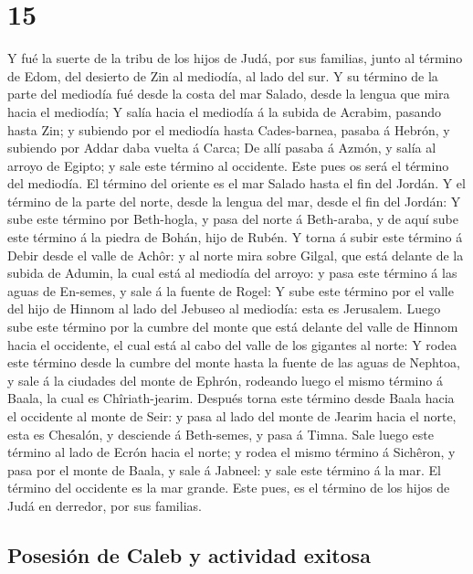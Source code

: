\hypertarget{section-14}{%
\section{15}\label{section-14}}

 Y fué la suerte de la tribu de los hijos de Judá, por sus
familias, junto al término de Edom, del desierto de Zin al mediodía, al
lado del sur.  Y su término de la parte del mediodía fué
desde la costa del mar Salado, desde la lengua que mira hacia el
mediodía;  Y salía hacia el mediodía á la subida de Acrabim,
pasando hasta Zin; y subiendo por el mediodía hasta Cades-barnea, pasaba
á Hebrón, y subiendo por Addar daba vuelta á Carca;  De allí
pasaba á Azmón, y salía al arroyo de Egipto; y sale este término al
occidente. Este pues os será el término del mediodía.  El
término del oriente es el mar Salado hasta el fin del Jordán. Y el
término de la parte del norte, desde la lengua del mar, desde el fin del
Jordán:  Y sube este término por Beth-hogla, y pasa del
norte á Beth-araba, y de aquí sube este término á la piedra de Bohán,
hijo de Rubén.  Y torna á subir este término á Debir desde
el valle de Achôr: y al norte mira sobre Gilgal, que está delante de la
subida de Adumin, la cual está al mediodía del arroyo: y pasa este
término á las aguas de En-semes, y sale á la fuente de Rogel:
 Y sube este término por el valle del hijo de Hinnom al lado
del Jebuseo al mediodía: esta es Jerusalem. Luego sube este término por
la cumbre del monte que está delante del valle de Hinnom hacia el
occidente, el cual está al cabo del valle de los gigantes al norte:
 Y rodea este término desde la cumbre del monte hasta la
fuente de las aguas de Nephtoa, y sale á la ciudades del monte de
Ephrón, rodeando luego el mismo término á Baala, la cual es
Chîriath-jearim.  Después torna este término desde Baala
hacia el occidente al monte de Seir: y pasa al lado del monte de Jearim
hacia el norte, esta es Chesalón, y desciende á Beth-semes, y pasa á
Timna.  Sale luego este término al lado de Ecrón hacia el
norte; y rodea el mismo término á Sichêron, y pasa por el monte de
Baala, y sale á Jabneel: y sale este término á la mar.  El
término del occidente es la mar grande. Este pues, es el término de los
hijos de Judá en derredor, por sus familias.

\hypertarget{posesiuxf3n-de-caleb-y-actividad-exitosa}{%
\subsection{Posesión de Caleb y actividad
exitosa}\label{posesiuxf3n-de-caleb-y-actividad-exitosa}}

